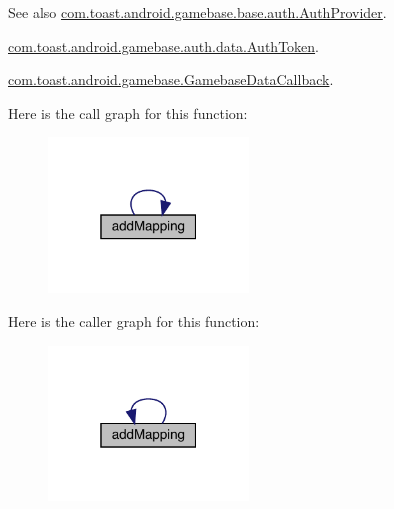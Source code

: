 \begin{DoxySeeAlso}{See also}
\hyperlink{interfacecom_1_1toast_1_1android_1_1gamebase_1_1base_1_1auth_1_1_auth_provider}{com.\+toast.\+android.\+gamebase.\+base.\+auth.\+Auth\+Provider}. 

\hyperlink{classcom_1_1toast_1_1android_1_1gamebase_1_1auth_1_1data_1_1_auth_token}{com.\+toast.\+android.\+gamebase.\+auth.\+data.\+Auth\+Token}. 

\hyperlink{interfacecom_1_1toast_1_1android_1_1gamebase_1_1_gamebase_data_callback}{com.\+toast.\+android.\+gamebase.\+Gamebase\+Data\+Callback}. 
\end{DoxySeeAlso}
Here is the call graph for this function\+:
\nopagebreak
\begin{figure}[H]
\begin{center}
\leavevmode
\includegraphics[width=151pt]{classcom_1_1toast_1_1android_1_1gamebase_1_1_gamebase_ab860dbc75a62b009d67eca25247493f1_cgraph}
\end{center}
\end{figure}
Here is the caller graph for this function\+:
\nopagebreak
\begin{figure}[H]
\begin{center}
\leavevmode
\includegraphics[width=151pt]{classcom_1_1toast_1_1android_1_1gamebase_1_1_gamebase_ab860dbc75a62b009d67eca25247493f1_icgraph}
\end{center}
\end{figure}
\mbox{\label{classcom_1_1toast_1_1android_1_1gamebase_1_1_gamebase_af629f12d988dd37b59259eeb63cdbdd0}} 
